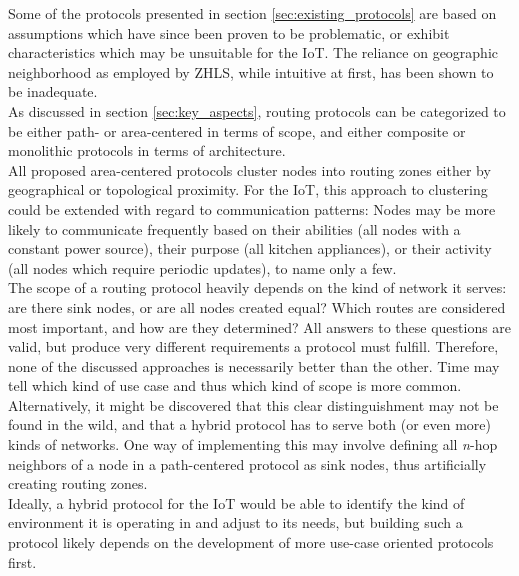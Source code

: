 \documentclass[a4paper,10pt]{scrartcl}
\begin{document}
Some of the protocols presented in section \ref{sec:existing_protocols} are based on assumptions which have since been proven to be problematic, or exhibit characteristics which may be unsuitable for the IoT. The reliance on geographic neighborhood as employed by ZHLS, while intuitive at first, has been shown to be inadequate.\\

As discussed in section \ref{sec:key_aspects}, routing protocols can be categorized to be either path- or area-centered in terms of scope, and either composite or monolithic protocols in terms of architecture.\\ %
All proposed area-centered protocols cluster nodes into routing zones either by geographical or topological proximity. For the IoT, this approach to clustering could be extended with regard to communication patterns: Nodes may be more likely to communicate frequently based on their abilities (all nodes with a constant power source), their purpose (all kitchen appliances), or their activity (all nodes which require periodic updates), to name only a few.\\
The scope of a routing protocol heavily depends on the kind of network it serves: are there sink nodes, or are all nodes created equal? Which routes are considered most important, and how are they determined? All answers to these questions are valid, but produce very different requirements a protocol must fulfill.
Therefore, none of the discussed approaches is necessarily better than the other. Time may tell which kind of use case and thus which kind of scope is more common. Alternatively, it might be discovered that this clear distinguishment may not be found in the wild, and that a hybrid protocol has to serve both (or even more) kinds of networks. One way of implementing this may involve defining all \emph{n}-hop neighbors of a node in a path-centered protocol as sink nodes, thus artificially creating routing zones.\\
Ideally, a hybrid protocol for the IoT would be able to identify the kind of environment it is operating in and adjust to its needs, but building such a protocol likely depends on the development of more use-case oriented protocols first.\\
\end{document}
